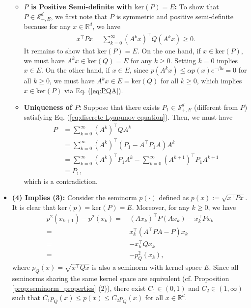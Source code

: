 \documentclass[11 pt]{article}
\begin{document}
\begin{itemize}
\begin{itemize}
			\item \textbf{$P$ is Positive Semi-definite with $\text{ker}(P)=E$:} 
			To show that $P \in \mathcal{S}^{d}_{+,E}$, we first note that $P$ is symmetric and positive semi-definite because for any $x \in \mathbb{R}^d$, we have
			\begin{align}\label{eq:PQA}
				x^\top P x = \sum^{\infty}_{k=0} \left(A^k x\right)^\top Q \left(A^k x\right) \geq 0.
			\end{align}
			It remains to show that $\text{ker}(P) = E$. On the one hand, if $x \in \text{ker}(P)$, we must have $A^kx\in \text{ker}(Q)=E$ for any $k\geq 0$. Setting $k=0$ implies $x\in E$. On the other hand, if $x\in E$, since $p(A^kx)\leq \alpha p(x)e^{-\beta k}=0$ for all $k\geq 0$, we must have $A^kx\in E=\text{ker}(Q)$ for all $k\geq 0$, which implies $x\in \text{ker}(P)$ via Eq. (\ref{eq:PQA}).
			\item \textbf{Uniqueness of $P$:} Suppose that there exists $P_1 \in \mathcal{S}^{d}_{+,E}$ (different from $P$) satisfying Eq. (\ref{eq:discrete Lyapunov equation}). Then, we must have
			\begin{align*}
				P &= \sum^\infty_{k=0} \left(A^k \right)^\top Q A^k\\
				&= \sum^\infty_{k=0} \left(A^k \right)^\top \left(P_1 - A^\top P_1A\right) A^k\\
				&= \sum^\infty_{k=0} \left(A^k \right)^\top P_1 A^k - \sum^\infty_{k=0} \left(A^{k+1} \right)^\top P_1 A^{k+1}\\
				&= P_1,
			\end{align*}
			which is a contradiction.
		\end{itemize}
		\item \textbf{(4) Implies (3):} Consider the seminorm $p(\cdot)$ defined as $p(x) := \sqrt{x^\top P x}$. It is clear that $\text{ker}(p)=\text{ker}(P)=E$. Moreover, for any $k \geq 0$, we have
		\begin{align*}
			p^2(x_{k+1}) - p^2(x_k)=\,& \left(Ax_k\right)^\top P \left(Ax_k\right) - x^\top_k P x_k \\
			=\,& x^\top_k \left(A^\top P A - P\right) x_k \\
			=\,& - x^\top_k Q x_k\\
			=\,&-p_{Q}^2(x_k),
		\end{align*}
		where $p_{Q}(x)=\sqrt{x^\top Qx}$ is also a seminorm with kernel space $E$. Since all seminorms sharing the same kernel space are equivalent (cf. Proposition \ref{prop:seminorm_properties} (2)), there exist $C_1\in (0,1)$ and $C_2\in (1,\infty)$ such that $C_1p_Q(x)\leq p(x)\leq C_2p_Q(x)$ for all $x\in\mathbb{R}^d$. 

\end{itemize}
\end{document}
